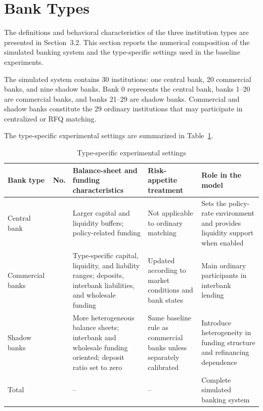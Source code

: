 \section{Bank Types}

The definitions and behavioral characteristics of the three institution
types are presented in Section~3.2. This section reports the numerical
composition of the simulated banking system and the type-specific
settings used in the baseline experiments.

The simulated system contains 30 institutions: one central bank, 20
commercial banks, and nine shadow banks. Bank 0 represents the central
bank, banks 1--20 are commercial banks, and banks 21--29 are shadow
banks. Commercial and shadow banks constitute the 29 ordinary
institutions that may participate in centralized or RFQ matching.

The type-specific experimental settings are summarized in Table~\ref{tab:bank-types}.


\begin{table}[htbp]
\centering
\caption{Type-specific experimental settings}
\label{tab:bank-types}
\scriptsize
\setlength{\tabcolsep}{3.2pt}
\renewcommand{\arraystretch}{1.18}
\begin{tabularx}{\textwidth}{@{}>{\raggedright\arraybackslash}p{1.55cm}>{\centering\arraybackslash}p{0.85cm}>{\raggedright\arraybackslash}p{4.30cm}>{\raggedright\arraybackslash}p{2.65cm}X@{}}
\toprule
\textbf{Bank type} & \textbf{No.} & \textbf{Balance-sheet and funding characteristics} & \textbf{Risk-appetite treatment} & \textbf{Role in the model}\\
\midrule
Central bank & 1 & Larger capital and liquidity buffers; policy-related funding & Not applicable to ordinary matching & Sets the policy-rate environment and provides liquidity support when enabled\\
Commercial banks & 20 & Type-specific capital, liquidity, and liability ranges; deposits, interbank liabilities, and wholesale funding & Updated according to market conditions and bank states & Main ordinary participants in interbank lending\\
Shadow banks & 9 & More heterogeneous balance sheets; interbank and wholesale funding oriented; deposit ratio set to zero & Same baseline rule as commercial banks unless separately calibrated & Introduce heterogeneity in funding structure and refinancing dependence\\
Total & 30 & -- & -- & Complete simulated banking system\\
\bottomrule
\end{tabularx}
\end{table}



